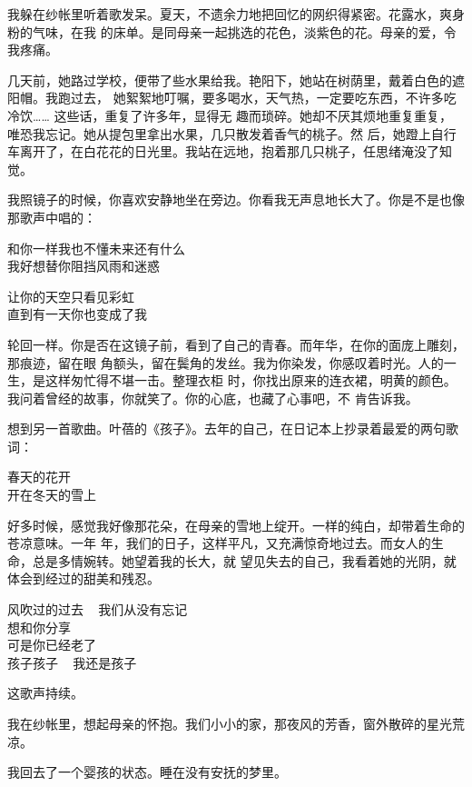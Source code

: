 		我躲在纱帐里听着歌发呆。夏天，不遗余力地把回忆的网织得紧密。花露水，爽身粉的气味，在我
	的床单。是同母亲一起挑选的花色，淡紫色的花。母亲的爱，令我疼痛。

		几天前，她路过学校，便带了些水果给我。艳阳下，她站在树荫里，戴着白色的遮阳帽。我跑过去，
	她絮絮地叮嘱，要多喝水，天气热，一定要吃东西，不许多吃冷饮…… 这些话，重复了许多年，显得无
	趣而琐碎。她却不厌其烦地重复重复，唯恐我忘记。她从提包里拿出水果，几只散发着香气的桃子。然
	后，她蹬上自行车离开了，在白花花的日光里。我站在远地，抱着那几只桃子，任思绪淹没了知觉。


		我照镜子的时候，你喜欢安静地坐在旁边。你看我无声息地长大了。你是不是也像那歌声中唱的：

		\longpoem{}{}{}
			和你一样我也不懂未来还有什么 \\
			我好想替你阻挡风雨和迷惑

			让你的天空只看见彩虹 \\
			直到有一天你也变成了我
		\endlongpoem

		轮回一样。你是否在这镜子前，看到了自己的青春。而年华，在你的面庞上雕刻，那痕迹，留在眼
	角额头，留在鬓角的发丝。我为你染发，你感叹着时光。人的一生，是这样匆忙得不堪一击。整理衣柜
	时，你找出原来的连衣裙，明黄的颜色。我问着曾经的故事，你就笑了。你的心底，也藏了心事吧，不
	肯告诉我。

		想到另一首歌曲。叶蓓的《孩子》。去年的自己，在日记本上抄录着最爱的两句歌词：

		\longpoem{}{}{}
			春天的花开 \\
			开在冬天的雪上
		\endlongpoem


		好多时候，感觉我好像那花朵，在母亲的雪地上绽开。一样的纯白，却带着生命的苍凉意味。一年
	年，我们的日子，这样平凡，又充满惊奇地过去。而女人的生命，总是多情婉转。她望着我的长大，就
	望见失去的自己，我看着她的光阴，就体会到经过的甜美和残忍。

		\longpoem{}{}{}
			风吹过的过去 ~ 我们从没有忘记 \\
			想和你分享 \\
			可是你已经老了 \\
			孩子孩子 ~ 我还是孩子
		\endlongpoem

		这歌声持续。

		我在纱帐里，想起母亲的怀抱。我们小小的家，那夜风的芳香，窗外散碎的星光荒凉。

		我回去了一个婴孩的状态。睡在没有安抚的梦里。

	\endwriting



